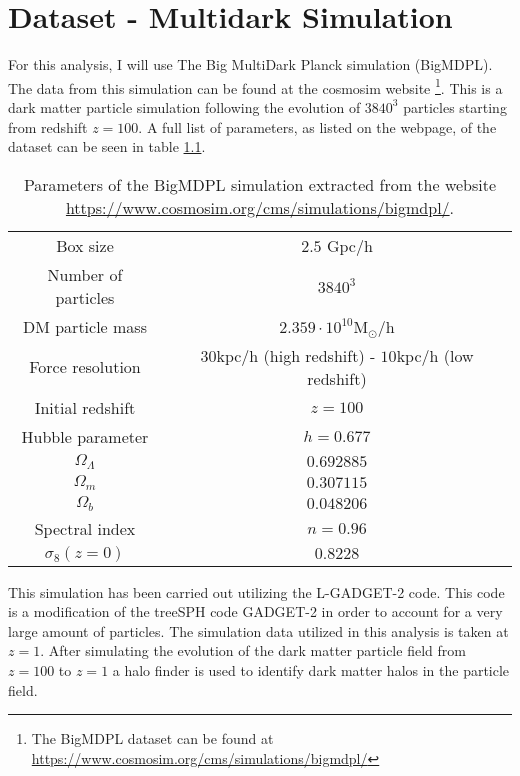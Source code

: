 \chapter{Dataset - Multidark Simulation}\label{sec:dataset}
For this analysis, I will use The Big MultiDark Planck simulation (BigMDPL)\cite{Multidark_dataset}. The data from this simulation can be found at the cosmosim website \footnote{The BigMDPL dataset can be found at \url{https://www.cosmosim.org/cms/simulations/bigmdpl/}}. This is a dark matter particle simulation following the evolution of $3840^3$ particles starting from redshift $z=100$. A full list of parameters, as listed on the webpage, of the dataset can be seen in table \ref{tab:cosmosimparameters}.
\begin{table}
    \begin{tabular}{| c | c |}
        \hline
        Box size & $2.5$ Gpc/h \\ 
        Number of particles& $3840^3$ \\  
        DM particle mass & $2.359\cdot10^{10} \mathrm{M}_\odot$/h \\
        Force resolution & $30$kpc/h (high redshift) - $10$kpc/h (low redshift)\\
        Initial redshift & $z = 100$\\
        Hubble parameter & $h=0.677$\\
        $\Omega_\Lambda$ & $0.692885$\\
        $\Omega_m$ & $ 0.307115$\\ 
        $ \Omega_b$ & $0.048206$ \\
        Spectral index & $n=0.96$\\
        $\sigma_8(z=0)$ & $0.8228$ \\
        \hline
    \end{tabular}
    \caption{Parameters of the BigMDPL simulation extracted from the website \url{https://www.cosmosim.org/cms/simulations/bigmdpl/}.}
    \label{tab:cosmosimparameters}
\end{table}
This simulation has been carried out utilizing the L-GADGET-2 code. This code is a modification of the treeSPH\cite{treesph} code GADGET-2\cite{springel2005} in order to account for a very large amount of particles. The simulation data utilized in this analysis is taken at $z=1$. After simulating the evolution of the dark matter particle field from $z=100$ to $z=1$ a halo finder is used to identify dark matter halos in the particle field.
